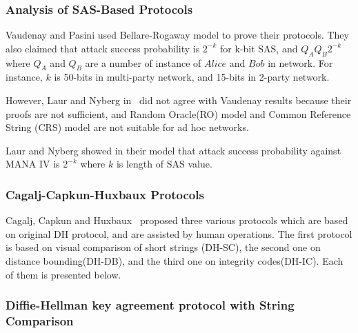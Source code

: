 \subsubsection*{Analysis of SAS-Based Protocols}

Vaudenay and Pasini used Bellare-Rogaway model to prove their protocols. They also claimed that attack success probability is $2^{-k}$ for k-bit SAS, and $Q_A Q_B 2^{-k}$ where $Q_A$ and $Q_B$ are a number of instance of $Alice$ and $Bob$ in network. For instance, $k$ is 50-bits in multi-party network, and 15-bits in 2-party network.

However, Laur and Nyberg in~\cite{Laur:2006kl} did not agree with Vaudenay results because their proofs are not sufficient, and Random Oracle(RO) model and Common Reference String (CRS) model are not suitable for ad hoc networks.

Laur and Nyberg showed in their model that attack success probability against MANA IV is $2^ {-k}$ where $k$ is length of SAS value.

\subsubsection{Cagalj-Capkun-Huxbaux Protocols}

Cagalj, Capkun and Huxbaux~\cite{1580514} proposed three various protocols which are based on original DH protocol, and are assisted by human operations. The first protocol is based on visual comparison of short strings (DH-SC), the second one on distance bounding(DH-DB), and the third one on integrity codes(DH-IC). Each of them is presented below. 
 
\subsubsection*{Diffie-Hellman key agreement protocol with String Comparison}

